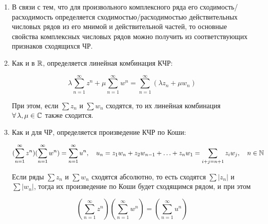 \documentclass[../../main.tex]{subfiles}
\begin{document}
\begin{rems}
	\begin{enumerate}
		\;
		
		\item В связи с тем, что для произвольного комплексного ряда его сходимость/расходимость определяется сходимостью/расходимостью действительных  
		числовых рядов из его мнимой и действительной частей, то основные свойства комплексных числовых рядов можно получить из соответствующих признаков 
		сходящихся ЧР.
		
		\item Как и в $ \mathbb{R} $, определяется линейная комбинация КЧР:
		
		\[\lambda \sum_{n=1}^{\infty}z^n + \mu \sum_{n=1}^{\infty}w^n = \sum_{n=1}^{\infty}(\lambda z_n + \mu w_n)\]
		
		При этом, если $ \sum z_n $ и $ \sum w_n $ сходятся, то их линейная комбинация $ \forall\, \lambda, \mu \in \mathbb{C} $ также сходится.
		
		\item Как и для ЧР, определяется произведение КЧР по Коши:
		
		\[(\sum_{n=1}^{\infty}z^n)(\sum_{n=1}^{\infty}w^n) = \sum_{n=1}^{\infty} u^n, \quad u_n = z_1w_{n} + z_2w_{n - 1} + \ldots + z_nw_1 = \sum_{i + j = n + 1} z_iw_j, \quad n \in \mathbb{N}\]
		
		Если ряды $ \sum z_n $ и $ \sum w_n $ сходятся абсолютно, то есть сходятся $ \sum |z_n| $ и $ \sum |w_n| $, тогда их произведение по Коши будет сходящимся рядом, и при этом
		
		\[(\sum_{n=1}^{\infty}z^n)(\sum_{n=1}^{\infty}w^n) = (\sum_{n=1}^{\infty}u^n)\]
	\end{enumerate}
\end{rems}
\end{document}
